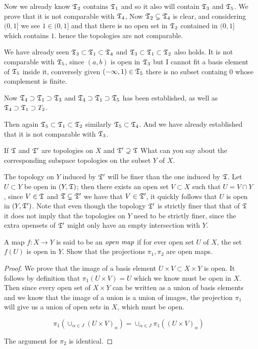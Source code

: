 Now we already know $\mathfrak{T}_2$ contains $\mathfrak{T}_1$ and so it also will contain $\mathfrak{T}_3$ and $\mathfrak{T}_5$. We prove that it is not comparable with $\mathfrak{T}_4$, Now $\mathfrak{T}_2 \subsetneq \mathfrak{T}_4$ is clear, and considering $(0, 1]$ we see $1 \in (0, 1]$ and that there is no open set in $\mathfrak{T}_2$ contained in $(0, 1]$ which contains $1$. 
hence the topologies are not comparable. 

We have already seen $\mathfrak{T}_3 \subset \mathfrak{T}_1 \subset \mathfrak{T}_4$ and $\mathfrak{T}_3 \subset \mathfrak{T}_1 \subset \mathfrak{T}_2$ also holds. It is not comparable with $\mathfrak{T}_5$, since $(a, b)$ is open in $\mathfrak{T}_3$ but I cannot fit a basis element of $\mathfrak{T}_5$ inside it, conversely given $(-\infty, 1) \in \mathfrak{T}_5$ there is no subset containg $0$ whose complement is finite. 


Now $\mathfrak{T}_4 \supset \mathfrak{T}_1  \supset \mathfrak{T}_3$ and $\mathfrak{T}_4 \supset \mathfrak{T}_1 \supset \mathfrak{T}_5$ has been established, as well as $\mathfrak{T}_4 \supset \mathfrak{T}_1 \supset T_2$. 


Then again $\mathfrak{T}_5 \subset \mathfrak{T}_1 \subset \mathfrak{T}_2$ similarly $\mathfrak{T}_5 \subset \mathfrak{T}_4$. And we have already established that it is not comparable with $\mathfrak{T}_3$. 

\question

If $\mathfrak{T}$ and $\mathfrak{T}^\prime$ are topologies on $X$ and $\mathfrak{T}^\prime \supsetneq \mathfrak{T}$ What can you say about the corresponding subspace topologies on the subset $Y$ of $X$.   

The topology on $Y$ induced by $\mathfrak{T}^\prime$ will be finer than the one induced by $\mathfrak{T}$. Let $U \subset Y$ be open in $(Y, \mathfrak{T})$; then there exists an open set $V \subset X$ 
such that $U = V \cap Y$, since $V \in \mathfrak{T}$ and $\mathfrak{T} \subsetneq \mathfrak{T}^\prime$ we have that $V \in \mathfrak{T}^\prime$, it quickly follows that $U$ is open in $(Y, \mathfrak{T}^\prime) $. 
Note that even though the topology $\mathfrak{T}^\prime$ is strictly finer that that of $\mathfrak{T}$ it does not imply that the topologies on $Y$ need to be strictly finer, since the extra opensets 
of $\mathfrak{T}^\prime$ might only have an empty intersection with $Y$. 


\question 
A map $f: X \to Y$ is said to be an $\emph{open map}$ if for ever open set $U$ of $X$, the set $f(U)$ is open in $Y$. Show that the projections $\pi_1, \pi_2$ are 
open maps. 

\begin{proof}
    We prove that the image of a basis element $U \times V \subset X \times Y$ is open. It follows by definition that $\pi_1(U \times V) = U$ which 
    we know must be open in $X$. Then since every open set of $X \times Y$ can be written as a union of basis elements and we know that the image of a union 
    is a union of images, the projection $\pi_1$ will give us a union of open sets in $X$, which must be open. 

    \[\pi_1 \left(\cup_{\alpha \in J} (U \times V)_\alpha \right) = \cup_{\alpha \in J} \pi_1((U \times V)_\alpha) \]

    The argument for $\pi_2$ is identical. 
\end{proof}



